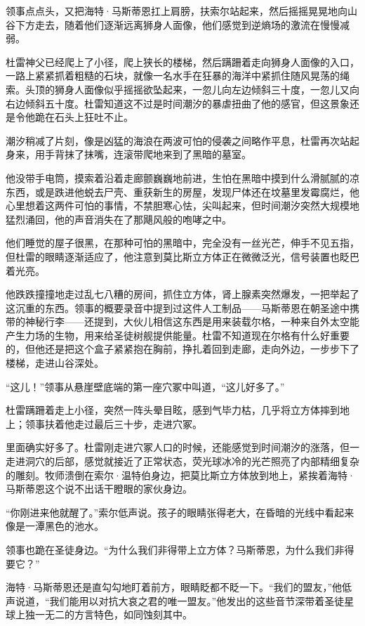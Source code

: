 \documentclass[AutoFakeBold=true]{book}
\begin{document}
领事点点头，又把海特·马斯蒂恩扛上肩膀，扶索尔站起来，然后摇摇晃晃地向山谷下方走去，随着他们逐渐远离狮身人面像，他们感觉到逆熵场的激流在慢慢减弱。

杜雷神父已经爬上了小径，爬上狭长的楼梯，然后蹒跚着走向狮身人面像的入口，一路上紧紧抓着粗糙的石块，就像一名水手在狂暴的海洋中紧抓住随风晃荡的绳索。头顶的狮身人面像似乎摇摇欲坠起来，一忽儿向左边倾斜三十度，一忽儿又向右边倾斜五十度。杜雷知道这不过是时间潮汐的暴虐扭曲了他的感官，但这景象还是令他跪在石头上狂吐不止。

潮汐稍减了片刻，像是凶猛的海浪在两波可怕的侵袭之间略作平息，杜雷再次站起身来，用手背抹了抹嘴，连滚带爬地来到了黑暗的墓室。

他没带手电筒，摸索着沿着走廊颤巍巍地前进，生怕在黑暗中摸到什么滑腻腻的凉东西，或是跌进他蜕去尸壳、重获新生的房屋，发现尸体还在坟墓里发霉腐烂，他心里想着这两件可怕的事情，不禁胆寒心怯，尖叫起来，但时间潮汐突然大规模地猛烈涌回，他的声音消失在了那飓风般的咆哮之中。

他们睡觉的屋子很黑，在那种可怕的黑暗中，完全没有一丝光芒，伸手不见五指，但杜雷的眼睛逐渐适应了，他注意到莫比斯立方体正在微微泛光，信号装置也眨巴着光亮。

他跌跌撞撞地走过乱七八糟的房间，抓住立方体，肾上腺素突然爆发，一把举起了这沉重的东西。领事的概要录音中提到过这件人工制品——马斯蒂恩在朝圣途中携带的神秘行李——还提到，大伙儿相信这东西是用来装载尔格，一种来自外太空能产生力场的生物，用来给圣徒树舰提供能量。杜雷不知道现在尔格有什么好重要的，但他还是把这个盒子紧紧抱在胸前，挣扎着回到走廊，走向外边，一步步下了楼梯，走进山谷深处。

``这儿！''领事从悬崖壁底端的第一座穴冢中叫道，``这儿好多了。''

杜雷蹒跚着走上小径，突然一阵头晕目眩，感到气毕力枯，几乎将立方体摔到地上；领事扶着他走过最后三十步，走进穴冢。

里面确实好多了。杜雷刚走进穴冢人口的时候，还能感觉到时间潮汐的涨落，但一走进洞穴的后部，感觉就接近了正常状态，荧光球冰冷的光芒照亮了内部精细复杂的雕刻。牧师溃倒在索尔·温特伯身边，把莫比斯立方体放到地上，紧挨着海特·马斯蒂恩这个说不出话干瞪眼的家伙身边。

``你刚进来他就醒了。''索尔低声说。孩子的眼睛张得老大，在昏暗的光线中看起来像是一潭黑色的池水。

领事也跪在圣徒身边。``为什么我们非得带上立方体？马斯蒂恩，为什么我们非得要它？''

海特·马斯蒂恩还是直勾勾地盯着前方，眼睛眨都不眨一下。``我们的盟友，''他低声说道，``我们能用以对抗大哀之君的唯一盟友。''他发出的这些音节深带着圣徒星球上独一无二的方言特色，如同蚀刻其中。
\end{document}
